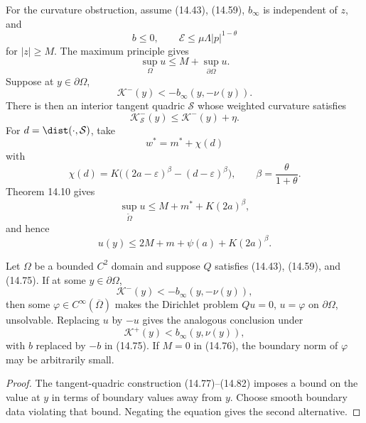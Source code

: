 For the curvature obstruction, assume (14.43), (14.59), $b_\infty$ is independent
of $z$, and
\begin{equation}
b\leq0,\qquad
\mathcal E\leq\mu\Lambda|p|^{1-\theta}
\tag{14.75}
\end{equation}
for $|z|\geq M$. The maximum principle gives
\begin{equation}
\sup_\Omega u\leq M+\sup_{\partial\Omega}u.
\tag{14.76}
\end{equation}
Suppose at $y\in\partial\Omega$,
\begin{equation}
\mathcal K^-(y)<-b_\infty(y,-\nu(y)).
\tag{14.77}
\end{equation}
There is then an interior tangent quadric $\mathcal S$ whose weighted curvature
satisfies
\begin{equation}
\mathcal K^-_{\mathcal S}(y)\leq\mathcal K^-(y)+\eta.
\tag{14.78}
\end{equation}
For $d=\dist(\cdot,\mathcal S)$, take
\begin{equation}
w^*=m^*+\chi(d)
\tag{14.79}
\end{equation}
with
\begin{equation}
\chi(d)=K\bigl((2a-\varepsilon)^\beta-(d-\varepsilon)^\beta\bigr),
\qquad\beta=\frac{\theta}{1+\theta}.
\tag{14.80}
\end{equation}
Theorem 14.10 gives
\begin{equation}
\sup_{\widetilde\Omega}u
\leq M+m^*+K(2a)^\beta,
\tag{14.81}
\end{equation}
and hence
\begin{equation}
u(y)\leq2M+m+\psi(a)+K(2a)^\beta.
\tag{14.82}
\end{equation}

\begin{theorem}
\label{gt14-boundary-gradient-14-12}
Let $\Omega$ be a bounded $C^2$ domain and suppose $Q$ satisfies
(14.43), (14.59), and (14.75). If at some $y\in\partial\Omega$,
\begin{equation}
\mathcal K^-(y)<-b_\infty(y,-\nu(y)),
\tag{14.83}
\end{equation}
then some $\varphi\in C^\infty(\overline\Omega)$ makes the Dirichlet problem
$Qu=0$, $u=\varphi$ on $\partial\Omega$, unsolvable. Replacing $u$ by $-u$
gives the analogous conclusion under
\begin{equation}
\mathcal K^+(y)<b_\infty(y,\nu(y)),
\tag{14.84}
\end{equation}
with $b$ replaced by $-b$ in (14.75). If $M=0$ in (14.76), the boundary
norm of $\varphi$ may be arbitrarily small.
\end{theorem}
\begin{proof}
\sketch The tangent-quadric construction (14.77)--(14.82) imposes a bound on
the value at $y$ in terms of boundary values away from $y$. Choose smooth
boundary data violating that bound. Negating the equation gives the second
alternative.
\end{proof}

